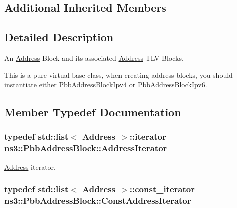 \subsection*{Additional Inherited Members}


\subsection{Detailed Description}
An \hyperlink{classns3_1_1Address}{Address} Block and its associated \hyperlink{classns3_1_1Address}{Address} T\+LV Blocks. 

This is a pure virtual base class, when creating address blocks, you should instantiate either \hyperlink{classns3_1_1PbbAddressBlockIpv4}{Pbb\+Address\+Block\+Ipv4} or \hyperlink{classns3_1_1PbbAddressBlockIpv6}{Pbb\+Address\+Block\+Ipv6}. 

\subsection{Member Typedef Documentation}
\subsubsection[{\texorpdfstring{Address\+Iterator}{AddressIterator}}]{\setlength{\rightskip}{0pt plus 5cm}typedef {\bf std\+::list}$<$ {\bf Address} $>$\+::iterator {\bf ns3\+::\+Pbb\+Address\+Block\+::\+Address\+Iterator}}\hypertarget{classns3_1_1PbbAddressBlock_a17f626a1684a378dae2bdf678b042e37}{}\label{classns3_1_1PbbAddressBlock_a17f626a1684a378dae2bdf678b042e37}


\hyperlink{classns3_1_1Address}{Address} iterator. 

\subsubsection[{\texorpdfstring{Const\+Address\+Iterator}{ConstAddressIterator}}]{\setlength{\rightskip}{0pt plus 5cm}typedef {\bf std\+::list}$<$ {\bf Address} $>$\+::const\+\_\+iterator {\bf ns3\+::\+Pbb\+Address\+Block\+::\+Const\+Address\+Iterator}}\hypertarget{classns3_1_1PbbAddressBlock_ac1f10df8f85c0c8d4b729352bc32a7cf}{}\label{classns3_1_1PbbAddressBlock_ac1f10df8f85c0c8d4b729352bc32a7cf}


